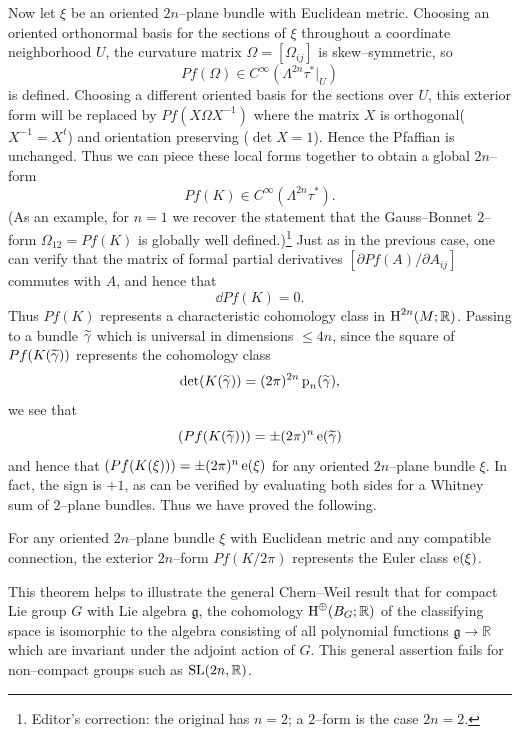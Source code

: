 \documentclass[../main]{subfiles}
\begin{document}
Now let $\xi$ be an oriented $2n$--plane bundle with Euclidean metric. Choosing an oriented orthonormal basis for the sections of $\xi$ throughout a coordinate neighborhood $U$, the curvature matrix $\Omega = [\Omega_{ij}]$ is skew--symmetric, so \[Pf(\Omega) \in C^\infty(\Lambda^{2n} \tau^\ast|_U)\] is defined. Choosing a different oriented basis for the sections over $U$, this exterior form will be replaced by $Pf(X \Omega X^{-1})$ where the matrix $X$ is orthogonal\newline ($X^{-1} = X^t$) and orientation preserving ($\det X = 1$). Hence the Pfaffian is unchanged. Thus we can piece these local forms together to obtain a global $2n$--form \[Pf(K) \in C^\infty(\Lambda^{2n} \tau^\ast).\] (As an example, for $n = 1$ we recover the statement that the Gauss--Bonnet $2$--form $\Omega_{12} = Pf(K)$ is globally well defined.)\footnote{Editor's correction: the original has $n=2$; a $2$--form is the case $2n=2$.} Just as in the previous case, one can verify that the matrix of formal partial derivatives $[\partial Pf(A)/\partial A_{ij}]$ commutes with $A$, and hence that \[\dd Pf(K) = 0.\] Thus $Pf(K)$ represents a characteristic cohomology class in $\operatorname{H}^{2n}(M; \mathbb R)$. Passing to a bundle ${\xtilde \gamma}$ which is universal in dimensions $\le 4n$, since the square of $Pf(K({\xtilde \gamma}))$ represents the cohomology class \[\det(K({\xtilde \gamma})) = (2\pi)^{2n} \pontrjaginclass_n({\xtilde \gamma}),\] we see that \[(Pf(K({\xtilde \gamma}))) = \pm (2 \pi)^n \eulerclass({\xtilde \gamma})\] and hence that $(Pf(K(\xi))) = \pm (2 \pi)^n \operatorname{e}(\xi)$ for any oriented $2n$--plane bundle $\xi$. In fact, the sign is $+1$, as can be verified by evaluating both sides for a Whitney sum of $2$--plane bundles. Thus we have proved the following.
\begin{theorem*}
For any oriented $2n$--plane bundle $\xi$ with Euclidean metric and any compatible connection, the exterior $2n$--form $Pf(K/2\pi)$ represents the Euler class $\operatorname{e}(\xi)$. 
\end{theorem*} 

\begin{remark*}
This theorem helps to illustrate the general Chern--Weil result that for  compact Lie group $G$ with Lie algebra $\mathfrak g$, the cohomology $\operatorname{H}^\oplus(B_G; \mathbb R)$ of the classifying space is isomorphic to the algebra consisting of all polynomial functions $\mathfrak g \longrightarrow \mathbb R$ which are invariant under the adjoint action of $G$. This general assertion fails for non--compact groups such as $\operatorname{SL}(2n, \mathbb R)$. 
\end{remark*} 
\end{document}

